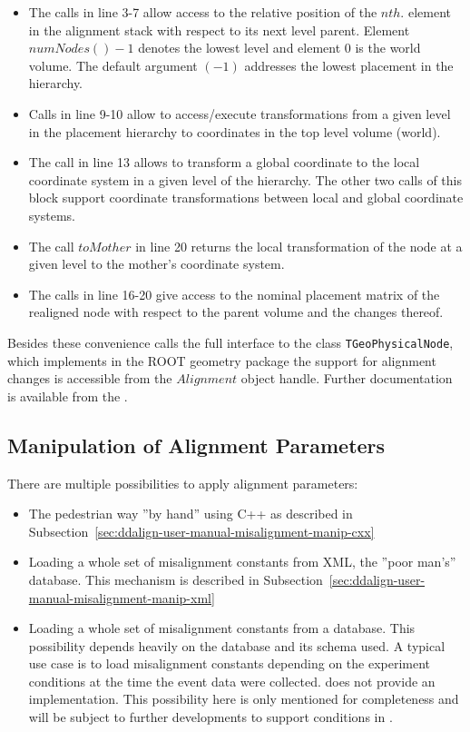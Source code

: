 \documentclass[10pt,a4paper]{article}
\begin{document}
\begin{itemize}\itemcompact
\item The calls in line 3-7 allow access to the relative position of the $nth.$ element
    in the alignment stack with respect to its next level parent. 
    Element $numNodes()-1$ denotes the lowest level and element $0$ is the world 
    volume. The default argument $(-1)$ addresses the lowest placement in the hierarchy.
\item Calls in line 9-10 allow to access/execute transformations from a given level
    in the placement hierarchy to coordinates in the top level volume (world).
\item The call in line 13 allows to transform a global coordinate to the local coordinate
    system in a given level of the hierarchy. The other two calls of this block support
    coordinate transformations between local and global coordinate systems.
\item The call $toMother$ in line 20 returns the local transformation of the node at
    a given level to the mother's coordinate system.
\item The calls in line 16-20 give access to the nominal placement matrix of the realigned
    node with respect to the parent volume and the changes thereof.
\end{itemize}
Besides these convenience calls the full interface to the class {\tt TGeoPhysicalNode}, 
which implements in the ROOT geometry package the support for alignment changes 
is accessible from the $Alignment$ object handle.
Further documentation is available from the .

\noindent
\subsection{Manipulation of Alignment Parameters}
\label{sec:ddalign-user-manual-misalignment-manip}
There are multiple possibilities to apply alignment parameters:
\begin{itemize}\itemcompact
\item The pedestrian way ''by hand'' using C++ as described in 
    Subsection~\ref{sec:ddalign-user-manual-misalignment-manip-cxx}
\item Loading a whole set of misalignment constants from XML, the ''poor man's'' database.
    This mechanism is described in
    Subsection~\ref{sec:ddalign-user-manual-misalignment-manip-xml}
\item Loading a whole set of misalignment constants from a database.
    This possibility depends heavily on the database and its schema used.
    A typical use case is to load misalignment constants depending on the
    experiment conditions at the time the event data were collected.
    \DDA does not provide an implementation.
    This possibility here is only mentioned for completeness and will be subject 
    to further developments to support conditions in \DDhep. 
\end{itemize}
\end{document}
